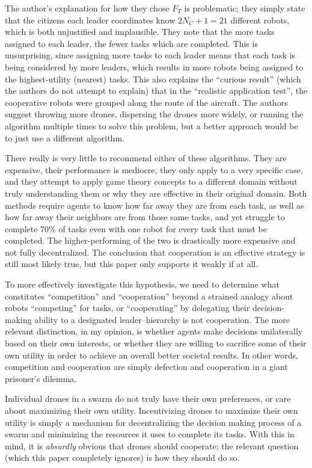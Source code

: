 \documentclass[11pt]{article}
\begin{document}
The author's explanation for how they chose $F_T$ is problematic; they simply state that the citizens each leader coordinates know $2N_C + 1 = 21$ different robots, which is both unjustified and implausible. They note that the more tasks assigned to each leader, the fewer tasks which are completed. This is unsurprising, since assigning more tasks to each leader means that each task is being considered by more leaders, which results in more robots being assigned to the highest-utility (nearest) tasks. This also explains the ``curious result'' (which the authors do not attempt to explain) that in the ``realistic application test'', the cooperative robots were grouped along the route of the aircraft. The authors suggest throwing more drones, dispersing the drones more widely, or running the algorithm multiple times to solve this problem, but a better approach would be to just use a different algorithm.

There really is very little to recommend either of these algorithms. They are expensive, their performance is mediocre, they only apply to a very specific case, and they attempt to apply game theory concepts to a different domain without truly understanding them or why they are effective in their original domain. Both methods require agents to know how far away they are from each task, as well as how far away their neighbors are from those same tasks, and yet struggle to complete  70\% of tasks even with one robot for every task that must be completed. The higher-performing of the two is drastically more expensive and not fully decentralized. The conclusion that cooperation is an effective strategy is still most likely true, but this paper only supports it weakly if at all.

To more effectively investigate this hypothesis, we need to determine what constitutes ``competition'' and ``cooperation'' beyond a strained analogy about robots ``competing'' for tasks, or ``cooperating'' by delegating their decision-making ability to a designated leader--hierarchy is not cooperation. The more relevant distinction, in my opinion, is whether agents make decisions unilaterally based on their own interests, or whether they are willing to sacrifice some of their own utility in order to achieve an overall better societal results. In other words, competition and cooperation are simply defection and cooperation in a giant prisoner's dilemma.

Individual drones in a swarm do not truly have their own preferences, or care about maximizing their own utility. Incentivizing drones to maximize their own utility is simply a mechanism for decentralizing the decision making process of a swarm and minimizing the resources it uses to complete its tasks. With this in mind, it is \textit{absurdly} obvious that drones should cooperate; the relevant question (which this paper completely ignores) is how they should do so.
\end{document}
